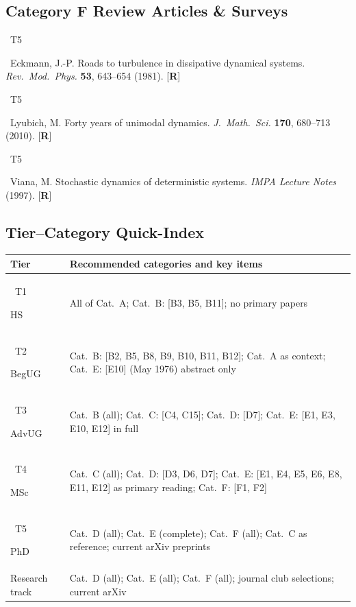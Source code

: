 \documentclass[11pt,a4paper]{article}
\newcommand{\tierbadge}[2]{%
  \colorbox{#1}{\small\bfseries\color{white}\strut\ #2\ }%
}
\begin{document}
\subsection*{Category F \quad Review Articles \& Surveys}

\begin{tcolorbox}[catbox]
\begin{enumerate}[leftmargin=2.5em, label=\textbf{[F\arabic*]}, itemsep=5pt]
  \item \tierbadge{t5red}{T5}\ Eckmann, J.-P. Roads to turbulence in dissipative dynamical systems. \textit{Rev.~Mod.~Phys.} \textbf{53}, 643--654 (1981). [\textbf{R}]
  \item \tierbadge{t5red}{T5}\ Lyubich, M. Forty years of unimodal dynamics. \textit{J.~Math.~Sci.} \textbf{170}, 680--713 (2010). [\textbf{R}]
  \item \tierbadge{t5red}{T5}\ Viana, M. Stochastic dynamics of deterministic systems. \textit{IMPA Lecture Notes} (1997). [\textbf{R}]
\end{enumerate}
\end{tcolorbox}

\bigskip
\subsection*{Tier--Category Quick-Index}

\begin{center}
\begin{tabular}{lp{11cm}}
\toprule
\textbf{Tier} & \textbf{Recommended categories and key items}\\
\midrule
\tierbadge{t1green}{T1} HS
  & All of Cat.~A; Cat.~B: [B3, B5, B11]; no primary papers\\[3pt]
\tierbadge{t2blue}{T2} BegUG
  & Cat.~B: [B2, B5, B8, B9, B10, B11, B12]; Cat.~A as context;
    Cat.~E: [E10] (May 1976) abstract only\\[3pt]
\tierbadge{t3purple}{T3} AdvUG
  & Cat.~B (all); Cat.~C: [C4, C15]; Cat.~D: [D7];
    Cat.~E: [E1, E3, E10, E12] in full\\[3pt]
\tierbadge{t4orange}{T4} MSc
  & Cat.~C (all); Cat.~D: [D3, D6, D7];
    Cat.~E: [E1, E4, E5, E6, E8, E11, E12] as primary reading;
    Cat.~F: [F1, F2]\\[3pt]
\tierbadge{t5red}{T5} PhD
  & Cat.~D (all); Cat.~E (complete); Cat.~F (all);
    Cat.~C as reference; current arXiv preprints\\[3pt]
Research track
  & Cat.~D (all); Cat.~E (all); Cat.~F (all);
    journal club selections; current arXiv\\
\bottomrule
\end{tabular}
\end{center}

\end{document}
